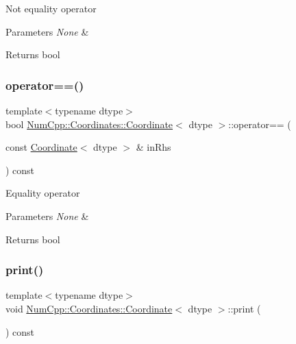 Not equality operator


\begin{DoxyParams}{Parameters}
{\em None} & \\
\hline
\end{DoxyParams}
\begin{DoxyReturn}{Returns}
bool 
\end{DoxyReturn}
\mbox{\label{class_num_cpp_1_1_coordinates_1_1_coordinate_ab45610b5c1480afe554ee58bc86990af}} 
\subsubsection{\texorpdfstring{operator==()}{operator==()}}
{\footnotesize\ttfamily template$<$typename dtype$>$ \\
bool \mbox{\hyperlink{class_num_cpp_1_1_coordinates_1_1_coordinate}{Num\+Cpp\+::\+Coordinates\+::\+Coordinate}}$<$ dtype $>$\+::operator== (\begin{DoxyParamCaption}\item[{const \mbox{\hyperlink{class_num_cpp_1_1_coordinates_1_1_coordinate}{Coordinate}}$<$ dtype $>$ \&}]{in\+Rhs }\end{DoxyParamCaption}) const\hspace{0.3cm}{\ttfamily [inline]}}

Equality operator


\begin{DoxyParams}{Parameters}
{\em None} & \\
\hline
\end{DoxyParams}
\begin{DoxyReturn}{Returns}
bool 
\end{DoxyReturn}
\mbox{\label{class_num_cpp_1_1_coordinates_1_1_coordinate_a01e9d9db5cdb57678f4aede1939214cf}} 
\subsubsection{\texorpdfstring{print()}{print()}}
{\footnotesize\ttfamily template$<$typename dtype$>$ \\
void \mbox{\hyperlink{class_num_cpp_1_1_coordinates_1_1_coordinate}{Num\+Cpp\+::\+Coordinates\+::\+Coordinate}}$<$ dtype $>$\+::print (\begin{DoxyParamCaption}{ }\end{DoxyParamCaption}) const\hspace{0.3cm}{\ttfamily [inline]}}

